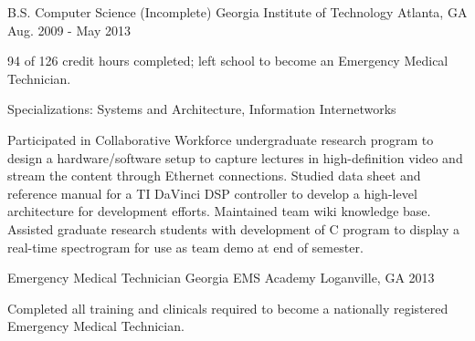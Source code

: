 

\begin{cventries}

  \cventry
    {B.S. Computer Science (Incomplete)} %
    {Georgia Institute of Technology} %
    {Atlanta, GA} %
    {Aug. 2009 - May 2013} %
    {
      \begin{cvitems} %
        \item {94 of 126 credit hours completed; left school to become an Emergency Medical Technician.}
        \item {Specializations: Systems and Architecture,  Information Internetworks}
        \item {Participated in Collaborative Workforce undergraduate research program to design a hardware/software setup to capture lectures in high-definition video and stream the content through Ethernet connections. Studied data sheet and reference manual for a TI DaVinci DSP controller to develop a high-level architecture for development efforts. Maintained team wiki knowledge base. Assisted graduate research students with development of C program to display a real-time spectrogram for use as team demo at end of semester.}
      \end{cvitems}
    }

  \cventry
  {Emergency Medical Technician} %
    {Georgia EMS Academy} %
    {Loganville, GA} %
    {2013} %
    {
      \begin{cvitems} %
        \item {Completed all training and clinicals required to become a nationally registered Emergency Medical Technician.}
      \end{cvitems}
    }
  

\end{cventries}
